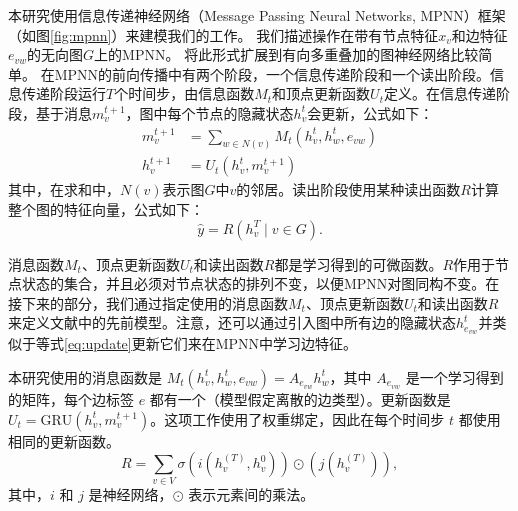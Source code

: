 本研究使用信息传递神经网络（Message Passing Neural Networks, MPNN）框架（如图\ref{fig:mpnn}）来建模我们的工作。
我们描述操作在带有节点特征$x_v$和边特征$e_{vw}$的无向图$G$上的MPNN。
将此形式扩展到有向多重叠加的图神经网络比较简单。
在MPNN的前向传播中有两个阶段，一个信息传递阶段和一个读出阶段。信息传递阶段运行$T$个时间步，由信息函数$M_t$和顶点更新函数$U_t$定义。在信息传递阶段，基于消息$m_v^{t+1}$，图中每个节点的隐藏状态$h_v^{t}$会更新，公式如下：
\vspace{3pt}  \begin{equation} \label{eq:update}
\begin{aligned}
m_v^{t+1} & = \sum\limits_{w \in N(v)} M_t(h_v^t, h_w^t, e_{vw}) \\
h_v^{t+1} & = U_t( h_v^t, m_v^{t+1})
\end{aligned}
\end{equation} \vspace{4pt}
其中，在求和中，$N(v)$表示图$G$中$v$的邻居。读出阶段使用某种读出函数$R$计算整个图的特征向量，公式如下：
\vspace{3pt}  \begin{equation} \label{eq:output}
\hat{y} = R({h_v^T \mid v \in G }).
\end{equation} \vspace{3pt}

消息函数$M_t$、顶点更新函数$U_t$和读出函数$R$都是学习得到的可微函数。$R$作用于节点状态的集合，并且必须对节点状态的排列不变，以便MPNN对图同构不变。在接下来的部分，我们通过指定使用的消息函数$M_t$、顶点更新函数$U_t$和读出函数$R$来定义文献中的先前模型。注意，还可以通过引入图中所有边的隐藏状态$h_{e_{vw}}^t$并类似于等式\ref{eq:update}更新它们来在MPNN中学习边特征。

本研究使用的消息函数是 $M_t(h_v^t, h_w^t, e_{vw}) = A_{e_{vw}} h_w^t$，其中 $A_{e_{vw}}$ 是一个学习得到的矩阵，每个边标签 $e$ 都有一个（模型假定离散的边类型）。更新函数是 $U_t = \textrm{GRU}(h_v^t, m_v^{t+1})$。这项工作使用了权重绑定，因此在每个时间步 $t$ 都使用相同的更新函数。
\vspace{3pt}  \begin{equation} \label{eq:graph_level}
R = \sum\limits_{v \in V} \sigma \left( i(h_v^{(T)}, h_v^0) \right) \odot \left( j(h_v^{(T)}) \right),
\end{equation} \vspace{4pt}
其中，$i$ 和 $j$ 是神经网络，$\odot$ 表示元素间的乘法。


